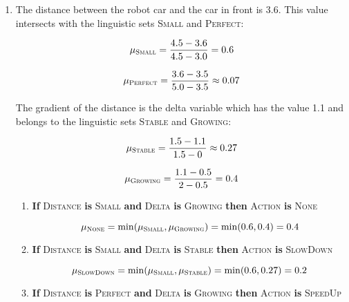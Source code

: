 \begin{enumerate}[label=\alph*)]
\item

The distance between the robot car and the car in front is 3.6. This value intersects with the linguistic sets \textsc{Small} and \textsc{Perfect}:

\begin{displaymath}
\mu_{\textsc{Small}} = \frac{4.5 - 3.6}{4.5 - 3.0} = 0.6
\end{displaymath}

\begin{displaymath}
\mu_{\textsc{Perfect}} = \frac{3.6 - 3.5}{5.0 - 3.5} \approx 0.07
\end{displaymath}

The gradient of the distance is the delta variable which has the value 1.1 and belongs to the linguistic sets \textsc{Stable} and \textsc{Growing}:

\begin{displaymath}
\mu_{\textsc{Stable}} = \frac{1.5 - 1.1}{1.5 - 0} \approx 0.27
\end{displaymath}

\begin{displaymath}
\mu_{\textsc{Growing}} = \frac{1.1 - 0.5}{2 - 0.5} = 0.4
\end{displaymath}

\begin{enumerate}[label=\textsc{Rule \arabic*}:]
\item \textbf{If} \textsc{Distance} \textbf{is} \textsc{Small} \textbf{and} \textsc{Delta} \textbf{is} \textsc{Growing} \textbf{then} \textsc{Action} \textbf{is} \textsc{None}

\begin{displaymath}
\mu_{\textsc{None}} = \min(\mu_{\textsc{Small}}, \mu_{\textsc{Growing}}) = \min(0.6, 0.4) = 0.4
\end{displaymath}

\item \textbf{If} \textsc{Distance} \textbf{is} \textsc{Small} \textbf{and} \textsc{Delta} \textbf{is} \textsc{Stable} \textbf{then} \textsc{Action} \textbf{is} \textsc{SlowDown}

\begin{displaymath}
\mu_{\textsc{SlowDown}} = \min(\mu_{\textsc{Small}}, \mu_{\textsc{Stable}}) = \min(0.6, 0.27) = 0.2
\end{displaymath}

\item \textbf{If} \textsc{Distance} \textbf{is} \textsc{Perfect} \textbf{and} \textsc{Delta} \textbf{is} \textsc{Growing} \textbf{then} \textsc{Action} \textbf{is} \textsc{SpeedUp}


\end{enumerate}
\end{enumerate}
